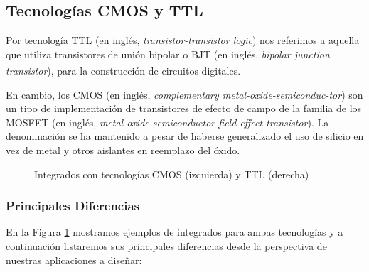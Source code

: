 \documentclass[a4paper]{article}
\let\originalcite\cite
\renewcommand{\cite}[2][]{\textsuperscript{\originalcite{#2}}}
\begin{document}
\subsection*{Tecnologías CMOS y TTL}

Por tecnología TTL (en inglés, \textit{transistor-transistor logic})
nos referimos a aquella que utiliza transistores de unión bipolar o 
BJT (en inglés, \textit{bipolar junction transistor}), para la 
construcción de circuitos digitales\cite{bib:boylestad}.

En cambio, los CMOS (en inglés, \textit{complementary 
metal-oxide-semiconduc-tor}) son un tipo de implementación de 
transistores de efecto de campo de la familia de los MOSFET (en 
inglés, \textit{metal-oxide-semiconductor field-effect transistor}). 
La denominación se ha mantenido a pesar de haberse generalizado el 
uso de silicio en vez de metal y otros aislantes en reemplazo del 
óxido.

\begin{figure}[h]\centering
    \caption{Integrados con tecnologías CMOS (izquierda) y TTL 
    (derecha)}\label{fig:transistores}
\end{figure}

\subsubsection*{Principales Diferencias}

En la Figura \ref{fig:transistores} mostramos ejemplos de integrados 
para ambas tecnologías y a continuación listaremos sus principales 
diferencias desde la perspectiva de nuestras aplicaciones a diseñar:
\end{document}

